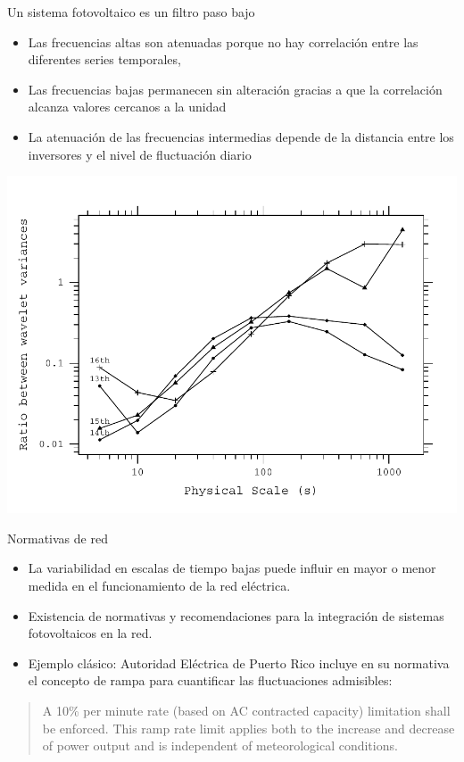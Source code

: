 \documentclass[aspectratio=169, usenames,svgnames,dvipsnames]{beamer}
\begin{document}
\begin{frame}[label={sec:orga7d1a7d}]{Un sistema fotovoltaico es un filtro paso bajo}
\begin{itemize}
\item Las frecuencias altas son atenuadas porque no hay correlación
entre las diferentes series temporales,
\item Las frecuencias bajas permanecen sin alteración gracias a que la
correlación alcanza valores cercanos a la unidad
\item La atenuación de las frecuencias intermedias depende de la
distancia entre los inversores y el nivel de fluctuación diario
\end{itemize}

\begin{center}
\includegraphics[height=0.55\textheight]{../figs/filtroPasoBajoWavelet.pdf}
\end{center}
\end{frame}

\begin{frame}[label={sec:orgc060118}]{Normativas de red}
\begin{itemize}
\item La variabilidad en escalas de tiempo bajas puede influir en mayor o
menor medida en el funcionamiento de la red eléctrica.
\item Existencia de normativas y recomendaciones para la integración de
sistemas fotovoltaicos en la red.
\item Ejemplo clásico: Autoridad Eléctrica de Puerto Rico incluye en su
normativa el concepto de rampa para cuantificar las fluctuaciones
admisibles:
\end{itemize}

\begin{quote}
A 10\% per minute rate (based on AC contracted capacity) limitation shall be enforced. This ramp rate limit applies both to the increase and decrease of power output and is independent of meteorological conditions.
\end{quote}
\end{frame}
\end{document}

